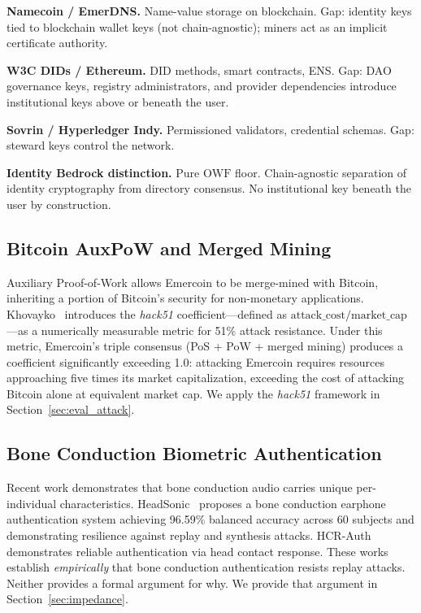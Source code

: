 \documentclass[11pt,a4paper]{article}
\theoremstyle{definition}
\newcommand{\OWF}{\mathrm{OWF}}
\newcommand{\BD}{\textsf{Identity Bedrock}}
\begin{document}
\textbf{Namecoin / EmerDNS.} Name-value storage on blockchain. Gap:
identity keys tied to blockchain wallet keys (not chain-agnostic);
miners act as an implicit certificate authority.

\textbf{W3C DIDs / Ethereum.} DID methods, smart contracts, ENS. Gap:
DAO governance keys, registry administrators, and provider
dependencies introduce institutional keys above or beneath the user.

\textbf{Sovrin / Hyperledger Indy.} Permissioned validators,
credential schemas. Gap: steward keys control the network.

\textbf{\BD{} distinction.} Pure $\OWF$ floor. Chain-agnostic
separation of identity cryptography from directory consensus. No
institutional key beneath the user by construction.

\subsection{Bitcoin AuxPoW and Merged Mining}

Auxiliary Proof-of-Work allows Emercoin to be merge-mined with
Bitcoin, inheriting a portion of Bitcoin's security for non-monetary
applications. Khovayko~\cite{Kho21} introduces the \emph{hack51}
coefficient---defined as $\text{attack\_cost} /
\text{market\_cap}$---as a numerically measurable metric for 51\%
attack resistance. Under this metric, Emercoin's triple consensus
(PoS + PoW + merged mining) produces a coefficient significantly
exceeding 1.0: attacking Emercoin requires resources approaching five
times its market capitalization, exceeding the cost of attacking
Bitcoin alone at equivalent market cap. We apply the \emph{hack51}
framework in Section~\ref{sec:eval_attack}.

\subsection{Bone Conduction Biometric Authentication}

Recent work demonstrates that bone conduction audio carries unique
per-individual characteristics. HeadSonic~\cite{HeadSonic25} proposes
a bone conduction earphone authentication system achieving 96.59\%
balanced accuracy across 60 subjects and demonstrating resilience
against replay and synthesis attacks. HCR-Auth~\cite{HCRAuth24}
demonstrates reliable authentication via head contact response.
These works establish \emph{empirically} that bone conduction
authentication resists replay attacks. Neither provides a formal
argument for why. We provide that argument in
Section~\ref{sec:impedance}.
\end{document}
